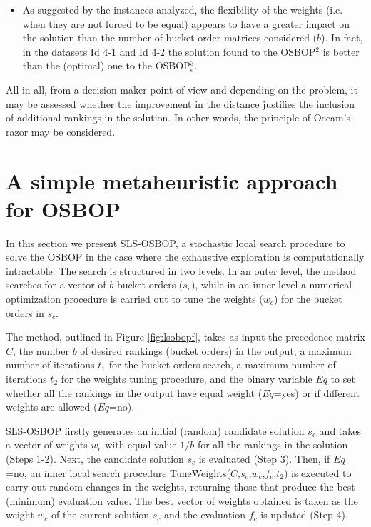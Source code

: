 \documentclass[preprint,12pt]{article}
\theoremstyle{definition}
\theoremstyle{remark}
\theoremstyle{example} %
\begin{document}
\begin{itemize}
    \item As suggested by the instances analyzed, the flexibility of the weights (i.e. when they are not forced to be equal)  appears to have a greater impact on the solution than the number of bucket order matrices considered ($b$). In fact, in the datasets Id 4-1 and Id 4-2 the solution found to the OSBOP$^2$ is better than the (optimal) one to the OSBOP$^3_e$.
    
    
\end{itemize}

All in all, from a decision maker point of view and depending on the problem, it may be assessed whether the improvement in the distance justifies the inclusion of additional rankings in the solution. In other words, the principle of Occam's razor may be considered.  



\section{A simple metaheuristic approach for OSBOP} \label{sec:method}

In this section we present SLS-OSBOP, a stochastic local search procedure  to solve  the OSBOP in the case where the exhaustive exploration is computationally intractable.
The search is structured in two levels. In an outer level, the method searches for a vector of $b$ bucket orders ($s_c$), while in an inner level a numerical optimization procedure is carried out to tune the weights ($w_c$) for the bucket orders in $s_c$.

The method, outlined in Figure \ref{fig:lsobopf},  takes as input the precedence matrix $C$, the number $b$ of desired rankings (bucket orders) in the output, a maximum number of iterations $t_1$ for the bucket orders search, a maximum number of iterations $t_2$ for the weights tuning procedure, and the binary variable $Eq$ to set whether all the rankings in the output have equal weight ($Eq$=yes) or if different weights are allowed ($Eq$=no).

SLS-OSBOP firstly generates an initial (random) candidate solution $s_c$  and takes a vector of weights $w_c$ with equal value $1/b$ for all the rankings in the solution (Steps 1-2). Next, the candidate solution $s_c$ is evaluated (Step 3). 
Then, if $Eq$=no,  an inner local search procedure {\sc TuneWeights}($C$,$s_c$,$w_c$,$f_c$,$t_2$) is executed to carry out random changes in the weights, returning those that produce the best (minimum) evaluation value. The best vector of weights obtained is taken as the weight $w_c$ of the current solution $s_c$ and the evaluation $f_c$ is updated (Step 4).
\end{document}
